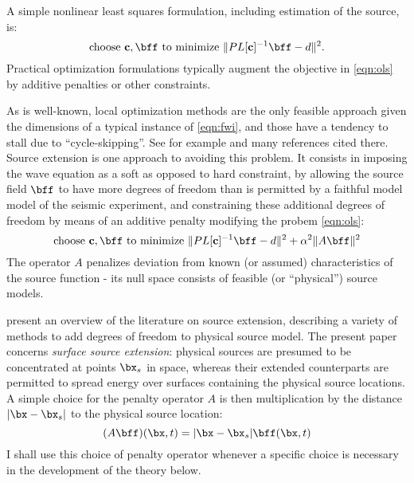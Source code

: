 A simple nonlinear least squares formulation, including estimation of the source, is:
\begin{equation}
\label{eqn:ols}
\mbox{choose } {\bf c}, \bff \mbox{ to minimize } \|PL[{\bf c}]^{-1}\bff -d \|^2.
\end{equation}
Practical optimization formulations typically augment the objective in
\ref{eqn:ols} by additive penalties or other constraints.

As is well-known, local optimization methods are the only feasible
approach given the dimensions of a typical instance of \ref{eqn:fwi},
and those have a tendency to stall due to ``cycle-skipping''. See for
example \cite{VirieuxOperto:09} and many references cited there. Source
extension is one approach to avoiding this problem. It consists in
imposing the wave equation as a soft as opposed to hard constraint, by
allowing the source field $\bff$ to have more degrees of freedom than
is permitted by a faithful model model of the seismic experiment, and
constraining these additional degrees of freedom by means of an
additive penalty modifying the probem \ref{eqn:ols}:
\begin{equation}
\label{eqn:esi}
\mbox{choose } {\bf c}, \bff \mbox{ to minimize } \|PL[{\bf c}]^{-1}\bff -d \|^2 + \alpha^2 \|A\bff\|^2 
\end{equation}
The operator $A$ penalizes deviation from known (or assumed)
characteristics of the source function - its null space consists of
feasible (or ``physical'') source models.

\cite{HuangNammourSymesDollizal:SEG19} present an overview of the
literature on source extension, describing a variety of
methods to add degrees of freedom to physical source model. The present paper
concerns {\em surface source extension}: physical sources are
presumed to be concentrated at points $\bx_s$ in space, whereas their extended
counterparts are permitted to spread energy over surfaces containing
the physical source locations. A simple choice for the penalty
operator $A$ is then multiplication by the distance $|\bx-\bx_s|$ to the physical
source location:
\begin{equation}
  \label{eqn:penop}
  (A\bff)(\bx,t) = |\bx-\bx_s|\bff(\bx,t)
\end{equation}
I shall use this choice of penalty operator whenever a specific choice
is necessary in the development of the theory below.

